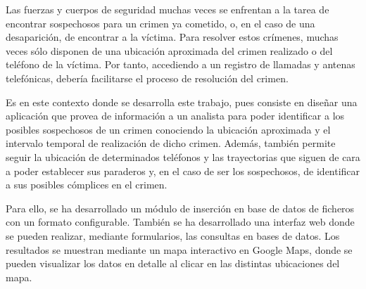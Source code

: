 Las fuerzas y cuerpos de seguridad muchas veces se enfrentan a la tarea de encontrar sospechosos para un crimen ya cometido, o, en el caso de una desaparición, de encontrar a la víctima. 
Para resolver estos crímenes, muchas veces sólo disponen de una ubicación aproximada del crimen realizado o del teléfono de la víctima. 
Por tanto, accediendo a un registro de llamadas y antenas telefónicas, debería facilitarse el proceso de resolución del crimen.

Es en este contexto donde se desarrolla este trabajo, pues consiste en diseñar una aplicación que provea de información a un analista para poder identificar a los posibles sospechosos de un crimen conociendo la ubicación aproximada y el intervalo temporal de realización de dicho crimen. 
Además, también permite seguir la ubicación de determinados teléfonos y las trayectorias que siguen de cara a poder establecer sus paraderos y, en el caso de ser los sospechosos, de identificar a sus posibles cómplices en el crimen.

Para ello, se ha desarrollado un módulo de inserción en base de datos de ficheros con un formato configurable.
También se ha desarrollado una interfaz web donde se pueden realizar, mediante formularios, las consultas en bases de datos.
Los resultados se muestran mediante un mapa interactivo en Google Maps, donde se pueden visualizar los datos en detalle al clicar en las distintas ubicaciones del mapa.


